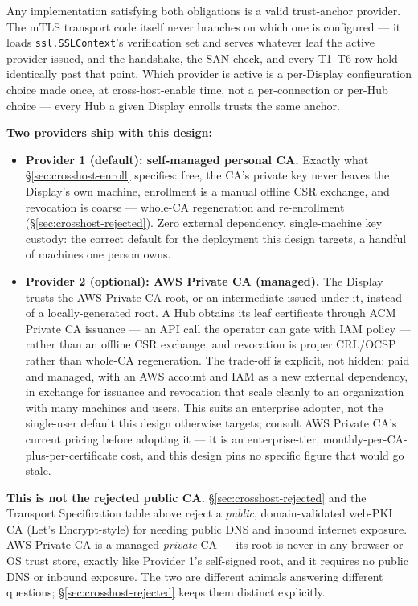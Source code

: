 \documentclass[a4paper,10pt]{article}
\newcommand{\field}[1]{\texttt{#1}}
\begin{document}
Any implementation satisfying both obligations is a valid trust-anchor
provider.  The mTLS transport code itself never branches on which one is
configured --- it loads \field{ssl.SSLContext}'s verification set and
serves whatever leaf the active provider issued, and the handshake, the
SAN check, and every T1--T6 row hold identically past that point.  Which
provider is active is a per-Display configuration choice made once, at
cross-host-enable time, not a per-connection or per-Hub choice --- every
Hub a given Display enrolls trusts the same anchor.

\textbf{Two providers ship with this design:}

\begin{itemize}
  \item \textbf{Provider 1 (default): self-managed personal CA.}  Exactly
    what \S\ref{sec:crosshost-enroll} specifies: free, the CA's private
    key never leaves the Display's own machine, enrollment is a manual
    offline CSR exchange, and revocation is coarse --- whole-CA
    regeneration and re-enrollment (\S\ref{sec:crosshost-rejected}).
    Zero external dependency, single-machine key custody: the correct
    default for the deployment this design targets, a handful of
    machines one person owns.
  \item \textbf{Provider 2 (optional): AWS Private CA (managed).}  The
    Display trusts the AWS Private CA root, or an intermediate issued
    under it, instead of a locally-generated root.  A Hub obtains its
    leaf certificate through ACM Private CA issuance --- an API call the
    operator can gate with IAM policy --- rather than an offline CSR
    exchange, and revocation is proper CRL/OCSP rather than whole-CA
    regeneration.  The trade-off is explicit, not hidden: paid and
    managed, with an AWS account and IAM as a new external dependency,
    in exchange for issuance and revocation that scale cleanly to an
    organization with many machines and users.  This suits an enterprise
    adopter, not the single-user default this design otherwise targets;
    consult AWS Private CA's current pricing before adopting it --- it is
    an enterprise-tier, monthly-per-CA-plus-per-certificate cost, and
    this design pins no specific figure that would go stale.
\end{itemize}

\textbf{This is not the rejected public CA.}  \S\ref{sec:crosshost-rejected}
and the Transport Specification table above reject a \emph{public},
domain-validated web-PKI CA (Let's Encrypt-style) for needing public DNS
and inbound internet exposure.  AWS Private CA is a managed \emph{private}
CA --- its root is never in any browser or OS trust store, exactly like
Provider 1's self-signed root, and it requires no public DNS or inbound
exposure.  The two are different animals answering different questions;
\S\ref{sec:crosshost-rejected} keeps them distinct explicitly.
\end{document}
